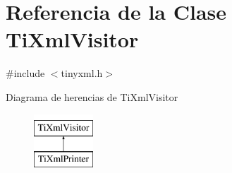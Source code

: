 \hypertarget{classTiXmlVisitor}{\section{\-Referencia de la \-Clase \-Ti\-Xml\-Visitor}
\label{classTiXmlVisitor}
}


{\ttfamily \#include $<$tinyxml.\-h$>$}

\-Diagrama de herencias de \-Ti\-Xml\-Visitor\begin{figure}[H]
\begin{center}
\leavevmode
\includegraphics[height=2.000000cm]{classTiXmlVisitor}
\end{center}
\end{figure}
